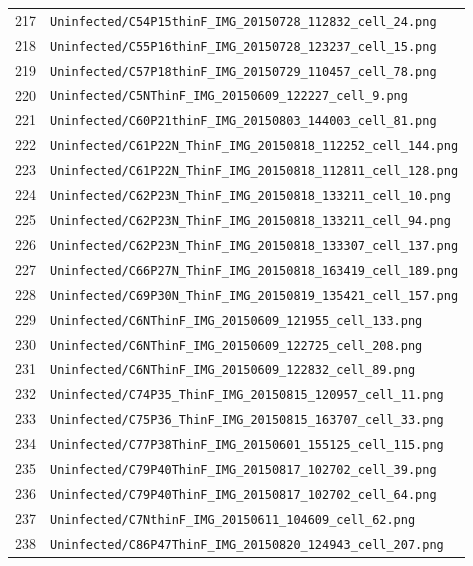 \begin{longtable}{r p{12cm}}
217 & \texttt{Uninfected/C54P15thinF\_IMG\_20150728\_112832\_cell\_24.png} \\
218 & \texttt{Uninfected/C55P16thinF\_IMG\_20150728\_123237\_cell\_15.png} \\
219 & \texttt{Uninfected/C57P18thinF\_IMG\_20150729\_110457\_cell\_78.png} \\
220 & \texttt{Uninfected/C5NThinF\_IMG\_20150609\_122227\_cell\_9.png} \\
221 & \texttt{Uninfected/C60P21thinF\_IMG\_20150803\_144003\_cell\_81.png} \\
222 & \texttt{Uninfected/C61P22N\_ThinF\_IMG\_20150818\_112252\_cell\_144.png} \\
223 & \texttt{Uninfected/C61P22N\_ThinF\_IMG\_20150818\_112811\_cell\_128.png} \\
224 & \texttt{Uninfected/C62P23N\_ThinF\_IMG\_20150818\_133211\_cell\_10.png} \\
225 & \texttt{Uninfected/C62P23N\_ThinF\_IMG\_20150818\_133211\_cell\_94.png} \\
226 & \texttt{Uninfected/C62P23N\_ThinF\_IMG\_20150818\_133307\_cell\_137.png} \\
227 & \texttt{Uninfected/C66P27N\_ThinF\_IMG\_20150818\_163419\_cell\_189.png} \\
228 & \texttt{Uninfected/C69P30N\_ThinF\_IMG\_20150819\_135421\_cell\_157.png} \\
229 & \texttt{Uninfected/C6NThinF\_IMG\_20150609\_121955\_cell\_133.png} \\
230 & \texttt{Uninfected/C6NThinF\_IMG\_20150609\_122725\_cell\_208.png} \\
231 & \texttt{Uninfected/C6NThinF\_IMG\_20150609\_122832\_cell\_89.png} \\
232 & \texttt{Uninfected/C74P35\_ThinF\_IMG\_20150815\_120957\_cell\_11.png} \\
233 & \texttt{Uninfected/C75P36\_ThinF\_IMG\_20150815\_163707\_cell\_33.png} \\
234 & \texttt{Uninfected/C77P38ThinF\_IMG\_20150601\_155125\_cell\_115.png} \\
235 & \texttt{Uninfected/C79P40ThinF\_IMG\_20150817\_102702\_cell\_39.png} \\
236 & \texttt{Uninfected/C79P40ThinF\_IMG\_20150817\_102702\_cell\_64.png} \\
237 & \texttt{Uninfected/C7NthinF\_IMG\_20150611\_104609\_cell\_62.png} \\
238 & \texttt{Uninfected/C86P47ThinF\_IMG\_20150820\_124943\_cell\_207.png} \\

\end{longtable}
